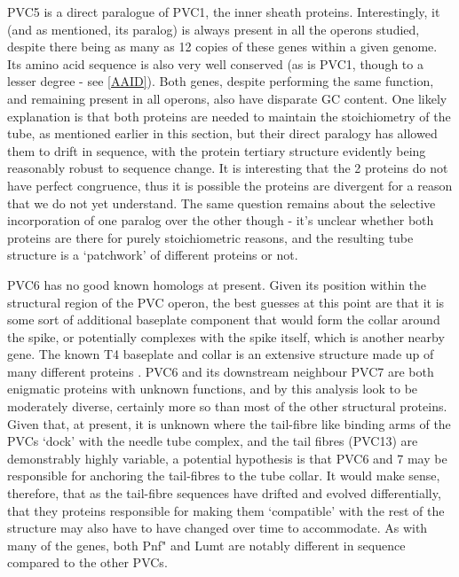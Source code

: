 PVC5 is a direct paralogue of PVC1, the inner sheath proteins. Interestingly, it (and as mentioned, its paralog) is always present in all the operons studied, despite there being as many as 12 copies of these genes within a given genome. Its amino acid sequence is also very well conserved (as is PVC1, though to a lesser degree - see \vref{AAID}). Both genes, despite performing the same function, and remaining present in all operons, also have disparate GC content. One likely explanation is that both proteins are needed to maintain the stoichiometry of the tube, as mentioned earlier in this section, but their direct paralogy has allowed them to drift in sequence, with the protein tertiary structure evidently being reasonably robust to sequence change. It is interesting that the 2 proteins do not have perfect congruence, thus it is possible the proteins are divergent for a reason that we do not yet understand. The same question remains about the selective incorporation of one paralog over the other though - it's unclear whether both proteins are there for purely stoichiometric reasons, and the resulting tube structure is a `patchwork' of different proteins or not.

PVC6 has no good known homologs at present. Given its position within the structural region of the PVC operon, the best guesses at this point are that it is some sort of additional baseplate component that would form the collar around the spike, or potentially complexes with the spike itself, which is another nearby gene. The known T4 baseplate and collar is an extensive structure made up of many different proteins \citep{Kostyuchenko2003}. PVC6 and its downstream neighbour PVC7 are both enigmatic proteins with unknown functions, and by this analysis look to be moderately diverse, certainly more so than most of the other structural proteins. Given that, at present, it is unknown where the tail-fibre like binding arms of the PVCs `dock' with the needle tube complex, and the tail fibres (PVC13) are demonstrably highly variable, a potential hypothesis is that PVC6 and 7 may be responsible for anchoring the tail-fibres to the tube collar. It would make sense, therefore, that as the tail-fibre sequences have drifted and evolved differentially, that they proteins responsible for making them `compatible' with the rest of the structure may also have to have changed over time to accommodate. As with many of the genes, both Pnf" and Lumt are notably different in sequence compared to the other PVCs.

